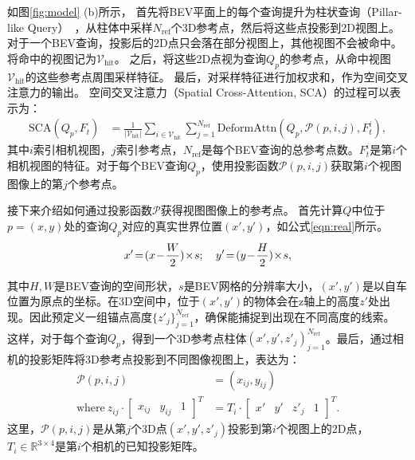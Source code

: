 \documentclass{article}
\begin{document}
如图\ref{fig:model} (b)所示，
首先将BEV平面上的每个查询提升为柱状查询（Pillar-like Query）~\cite{lang2019pointpillars}，从柱体中采样${N_\text{ref}}$个3D参考点，然后将这些点投影到2D视图上。对于一个BEV查询，投影后的2D点只会落在部分视图上，其他视图不会被命中。将命中的视图记为$\mathcal{V}_\text{hit}$。
之后，将这些2D点视为查询$Q_p$的参考点，从命中视图$\mathcal{V}_\text{hit}$的这些参考点周围采样特征。
最后，对采样特征进行加权求和，作为空间交叉注意力的输出。
空间交叉注意力（Spatial Cross-Attention, SCA）的过程可以表示为：
\begin{align}\label{sca}
    \text{SCA}(Q_p, F_t) &= \frac{1}{|\mathcal{V}_\text{hit}|} \sum_{i\in \mathcal{V}_\text{hit}} \sum_{j=1}^{{N_\text{ref}}}
    \text{DeformAttn}(Q_p, \mathcal{P}(p,i,j), F_t^i),
\end{align}
%
其中$i$索引相机视图，$j$索引参考点，${N_\text{ref}}$是每个BEV查询的总参考点数。$F_t^i$是第$i$个相机视图的特征。对于每个BEV查询$Q_p$，使用投影函数$\mathcal{P}(p, i, j)$获取第$i$个视图图像上的第$j$个参考点。

接下来介绍如何通过投影函数$\mathcal{P}$获得视图图像上的参考点。
首先计算$Q$中位于$p=(x,y)$处的查询$Q_p$对应的真实世界位置$(x', y')$，如公式\ref{eqn:real}所示。
\begin{equation}{\label{eqn:real}}
    x'\!=\! (x\!-\!\frac{W}{2})\!\times\! s; \quad y'\! = \!(y\!-\!\frac{H}{2})\!\times\! s,
\end{equation}

其中$H,W$是BEV查询的空间形状，$s$是BEV网格的分辨率大小，$(x',y')$是以自车位置为原点的坐标。在3D空间中，位于$(x', y')$的物体会在z轴上的高度$z'$处出现。因此预定义一组锚点高度$\{z'_j\}_{j=1}^{N_\text{ref}}$，确保能捕捉到出现在不同高度的线索。
这样，对于每个查询$Q_p$，得到一个3D参考点柱体${(x', y', z'_j)}_{j=1}^{{N_\text{ref}}}$。最后，通过相机的投影矩阵将3D参考点投影到不同图像视图上，表达为：
\begin{equation}
\begin{split}
\label{project}
\mathcal{P}(p,i,j)& = (x_{ij},y_{ij})\\
\text{where}\ z_{ij}\cdot\begin{bmatrix} x_{ij} &y_{ij} & 1 \end{bmatrix}^T&= T_i \cdot \begin{bmatrix} x' &y' &z'_j & 1 \end{bmatrix}^T .
\end{split}
\end{equation}
这里，$\mathcal{P}(p,i,j)$是从第$j$个3D点$(x', y', z'_j)$投影到第$i$个视图上的2D点，$T_i\!\in\! \mathbb{R}^{3\!\times\! 4}$是第$i$个相机的已知投影矩阵。 
\end{document}
